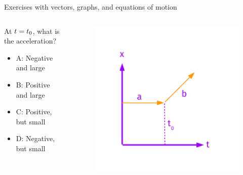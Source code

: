 \documentclass{beamer}
\begin{document}
\begin{frame}{Exercises with vectors, graphs, and equations of motion}
\begin{columns}[T]
\begin{column}{0.4\textwidth}
\small
At $t=t_{\rm 0}$, what is the acceleration?
\begin{itemize}
\item A: Negative and large
\item B: Positive and large
\item C: Positive, but small
\item D: Negative, but small
\end{itemize}
\end{column}
\begin{column}{0.6\textwidth}
\begin{figure}
\centering
\includegraphics[width=\textwidth,trim=0cm 0cm 0cm 1.5cm,clip=true]{figures/Vectors3.pdf}
\end{figure}
\end{column}
\end{columns}
\end{frame}
\end{document}
